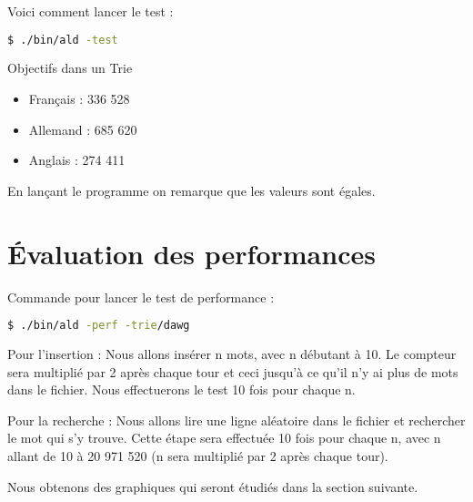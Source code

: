 Voici comment lancer le test :
\begin{lstlisting}[language=bash]
    $ ./bin/ald -test
\end{lstlisting}

Objectifs dans un Trie
\begin{itemize}
\item Français : 336 528
\item Allemand : 685 620
\item Anglais : 274 411
\end{itemize}

En lançant le programme on remarque que les valeurs sont égales.

\section{Évaluation des performances}

Commande pour lancer le test de performance :
\begin{lstlisting}[language=bash]
    $ ./bin/ald -perf -trie/dawg
\end{lstlisting}

Pour l'insertion :
\smallskip \newline Nous allons insérer n mots, avec n débutant à 10. Le compteur sera multiplié par 2 après chaque tour et ceci jusqu'à ce qu'il n'y ai plus de mots dans le fichier. Nous effectuerons le test 10 fois pour chaque n.

Pour la recherche :
\smallskip \newline Nous allons lire une ligne aléatoire dans le fichier et rechercher le mot qui s'y trouve.
Cette étape sera effectuée 10 fois pour chaque n, avec n allant de 10 à 20 971 520 (n sera multiplié par 2 après chaque tour).

Nous obtenons des graphiques qui seront étudiés dans la section suivante.